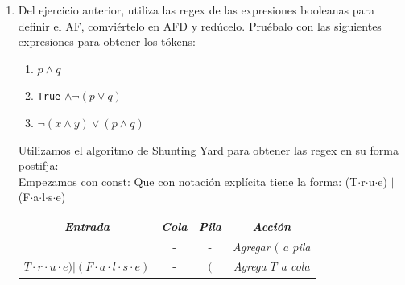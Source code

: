 \documentclass[12pt, letterpaper]{article}
\begin{document}
\begin{enumerate}
    Para construir el lexer seguiremos los siguientes pasos en este orden:
    \begin{enumerate}
    \item Definimos las regex $R_i$ que corresponde a cada tipo de token en el lenguaje.
    \item Construir un AFN para cada regex. (Esto incluye convertir una expresión en su forma postfija usando shunting-yard).
    \item Unir los AFNs de cada regex para cada patrón en un solo AFN.
    \item Convertir el AFN del punto anterior en un AFD.
    \item Minimizar el AFN.
    \end{enumerate}
    \begin{enumerate}
    \item Las regex son las siguientes:\\
      \textbf{const:} True $|$ False\\
      \textbf{var:} [a-z]\\
      \textbf{binop:} $\wedge$$|$$\vee$$|$$\neg$
    \end{enumerate}
  \item Del ejercicio anterior, utiliza las regex de las expresiones booleanas para definir el AF, comviértelo en
    AFD y redúcelo. Pruébalo con las siguientes expresiones para obtener los tókens:
    \begin{enumerate}
    \item $p \land q$
    \item \texttt{True} $ \land \neg(p \lor q)$
    \item $\neg(x \land y) \lor (p \land q)$
    \end{enumerate}
    Utilizamos el algoritmo de Shunting Yard para obtener las regex en su forma postifja:\\
    Empezamos con const:
    Que con notación explícita tiene la forma:
    (T$\cdot$r$\cdot$u$\cdot$e) $|$ (F$\cdot$a$\cdot$l$\cdot$s$\cdot$e)
    \begin{table}[htbp]
      \centering
      \begin{tabular}{cccc}
        \toprule
        \textbf{\textit{Entrada}} & \textbf{\textit{Cola}} & \textbf{\textit{Pila}} & \textbf{\textit{Acci\'on}} \\
        & - & - & \textit{Agregar $($ a pila} \\
        $T \cdot r \cdot u \cdot e) | (F \cdot a \cdot l \cdot s \cdot e)$ & - & $($ & \textit{Agrega $T$ a cola} \\

\end{tabular}
\end{table}
\end{enumerate}
\end{document}
